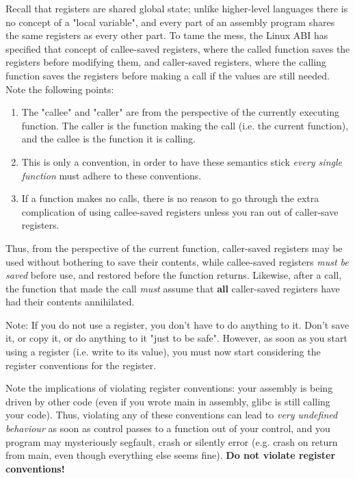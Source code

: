 \documentclass[11pt]{article}
\begin{document}
Recall that registers are shared global state; unlike higher-level languages there is no
concept of a "local variable", and every part of an assembly program shares the same
registers as every other part. To tame the mess, the Linux ABI has specified that concept
of callee-saved registers, where the called function saves the registers before
modifying them, and caller-saved registers, where the calling function saves the registers
before making a call if the values are still needed. Note the following points:

\begin{enumerate}
    \item The "callee" and "caller" are from the perspective of the currently executing
        function. The caller is the function making the call (i.e. the current function),
        and the callee is the function it is calling.
    \item This is only a convention, in order to have these semantics stick \emph{every
        single function} must adhere to these conventions.
    \item If a function makes no calls, there is no reason to go through the extra
        complication of using callee-saved registers unless you ran out of caller-save
        registers.
\end{enumerate}

Thus, from the perspective of the current function, caller-saved registers may be used
without bothering to save their contents, while callee-saved registers \emph{must be
saved} before use, and restored before the function returns. Likewise, after a call, the
function that made the call \emph{must} assume that \textbf{all} caller-saved registers
have had their contents annihilated.

Note: If you do not use a register, you don't have to do anything to it. Don't save it, or
copy it, or do anything to it "just to be safe". However, as soon as you start using a
register (i.e. write to its value), you must now start considering the register
conventions for the register.

Note the implications of violating register conventions: your assembly is being driven by
other code (even if you wrote main in assembly, glibc is still calling your code). Thus,
violating any of these conventions can lead to \emph{very undefined behaviour} as soon as
control passes to a function out of your control, and you program may mysteriously
segfault, crash or silently error (e.g. crash on return from main, even though everything
else seems fine). \textbf{Do not violate register conventions!}
\end{document}
